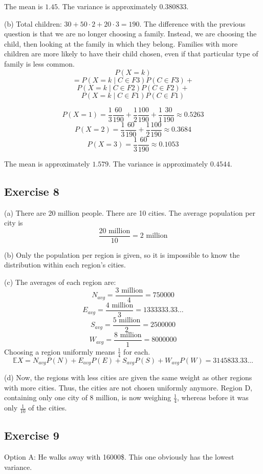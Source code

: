 \documentclass{book}
\begin{document}
The mean is $1.45$. The variance is approximately $0.380833$.

\noindent
(b)
Total children: $30 + 50 \cdot 2 + 20 \cdot 3 = 190$. The difference with the previous question is that we are no longer choosing a family. Instead, we are choosing the child, then looking at the family in which they belong. Families with more children are more likely to have their child chosen, even if that particular type of family is less common.
$$P(X = k)$$
$$=P(X = k \mid C \in F3) P(C \in F3) +$$
$$P(X = k \mid C \in F2) P(C \in F2) +$$
$$P(X = k \mid C \in F1) P(C \in F1)$$

$$P(X = 1) = \frac{1}{3} \frac{60}{190} + \frac{1}{2} \frac{100}{190} + \frac{1}{1} \frac{30}{190} \approx 0.5263$$
$$P(X = 2) = \frac{1}{3} \frac{60}{190} + \frac{1}{2} \frac{100}{190} \approx 0.3684$$
$$P(X = 3) = \frac{1}{3} \frac{60}{190} \approx 0.1053$$

The mean is approximately $1.579$. The variance is approximately $0.4544$.

\subsection*{Exercise 8}
(a) There are 20 million people. There are 10 cities. The average population per city is
$$\frac{20 \text{ million}}{10} = 2 \text{ million}$$

\noindent
(b) Only the population per region is given, so it is impossible to know the distribution within each region's cities.

\noindent
(c) The averages of each region are:
$$N_{avg} = \frac{3 \text{ million}}{4} = 750000$$
$$E_{avg} = \frac{4 \text{ million}}{3} = 1333333.33 \ldots$$
$$S_{avg} = \frac{5 \text{ million}}{2} = 2500000$$
$$W_{avg} = \frac{8 \text{ million}}{1} = 8000000$$
Choosing a region uniformly means $\frac{1}{4}$ for each.
$$\mathbb{E} X = N_{avg} P(N) + E_{avg} P(E) + S_{avg} P(S) + W_{avg} P(W) = 3145833.33 \ldots$$

\noindent
(d) Now, the regions with less cities are given the same weight as other regions with more cities. Thus, the cities are not chosen uniformly anymore. Region D, containing only one city of 8 million, is now weighing $\frac{1}{4}$, whereas before it was only $\frac{1}{10}$ of the cities.

\subsection*{Exercise 9}
Option A: He walks away with 16000\$. This one obviously has the lowest variance.
\end{document}
